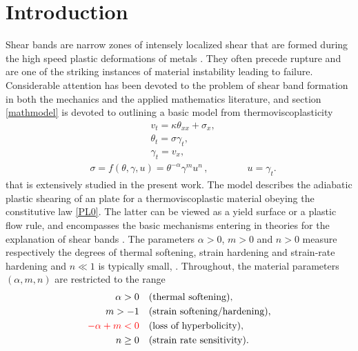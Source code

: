 \documentclass[a4paper,11pt]{article}
\def\red{\color{red}}
\theoremstyle{remark}
\begin{document}
 \tableofcontents


\vfil\eject


\section{Introduction}

Shear bands are narrow zones of intensely localized shear that are formed during the high speed plastic deformations of metals \cite{ZH44, Clifton90,Wright02}. 
They often precede rupture and are one of the striking instances of material instability leading to failure.  Considerable attention has been devoted to the
problem of shear band formation in both the mechanics and the applied mathematics literature, and section \ref{mathmodel} is devoted to outlining
a basic model from thermoviscoplasticity
\begin{equation}
  \label{sbeq}
  \begin{aligned}
    & v_{t} =  \kappa \theta_{ x x} +  \sigma_{x},\\
    & \theta_{t} =  \sigma \gamma_{t}, \\
    & \gamma_{t} = v_{x},
  \end{aligned}
\end{equation}
\begin{align}
&  \sigma =  f(\theta, \gamma, u) = \theta^{-\alpha} \gamma^{m} u^{n} \, , \quad \quad \qquad \text{$u = \gamma_t$}. \label{PL0}
\end{align}
that is extensively studied in the present work. The model describes the adiabatic plastic shearing of an plate for
a thermoviscoplastic material obeying the constitutive law \eqref{PL0}. The latter can be viewed as a yield surface or a plastic flow rule, and encompasses the basic
mechanisms entering in theories for the explanation of shear bands \cite{ZH44,Clifton90}.
The parameters $\alpha>0$, $m>0$ and $n>0$ measure respectively the degrees of thermal softening, strain hardening and  strain-rate hardening and $n \ll 1$
is typically small, \cite{Clifton90}. 
Throughout, the material parameters $(\alpha,m,n)$ are restricted to the range
\begin{equation}
 \begin{aligned}
  \alpha>0\quad&\text{(thermal softening)},\\
  m>-1 \quad&\text{(strain softening/hardening)}, \\%
  \red-\alpha+m<0 \quad&\text{(loss of hyperbolicity)},\\%
  n\ge0 \quad&\text{(strain rate sensitivity)}. %
\end{aligned}\label{eq:paramrange}
\end{equation}
\end{document}
